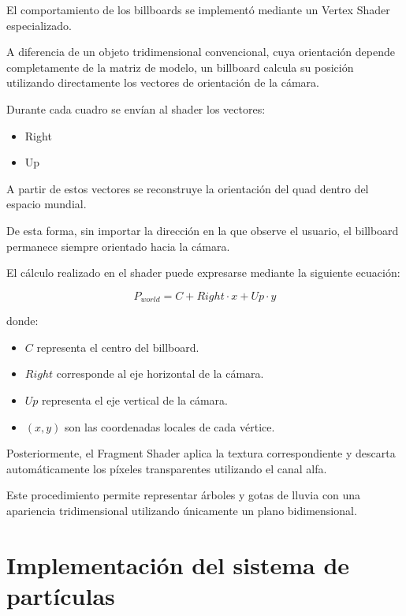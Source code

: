 El comportamiento de los billboards se implementó mediante un Vertex Shader especializado.

A diferencia de un objeto tridimensional convencional, cuya orientación depende completamente de la matriz de modelo, un billboard calcula su posición utilizando directamente los vectores de orientación de la cámara.

Durante cada cuadro se envían al shader los vectores:

\begin{itemize}

\item Right
\item Up

\end{itemize}

A partir de estos vectores se reconstruye la orientación del quad dentro del espacio mundial.

De esta forma, sin importar la dirección en la que observe el usuario, el billboard permanece siempre orientado hacia la cámara.

El cálculo realizado en el shader puede expresarse mediante la siguiente ecuación:

\[
P_{world}
=
C
+
Right \cdot x
+
Up \cdot y
\]

donde:

\begin{itemize}

\item $C$ representa el centro del billboard.

\item $Right$ corresponde al eje horizontal de la cámara.

\item $Up$ representa el eje vertical de la cámara.

\item $(x,y)$ son las coordenadas locales de cada vértice.

\end{itemize}

Posteriormente, el Fragment Shader aplica la textura correspondiente y descarta automáticamente los píxeles transparentes utilizando el canal alfa.

Este procedimiento permite representar árboles y gotas de lluvia con una apariencia tridimensional utilizando únicamente un plano bidimensional.

\section{Implementación del sistema de partículas}

